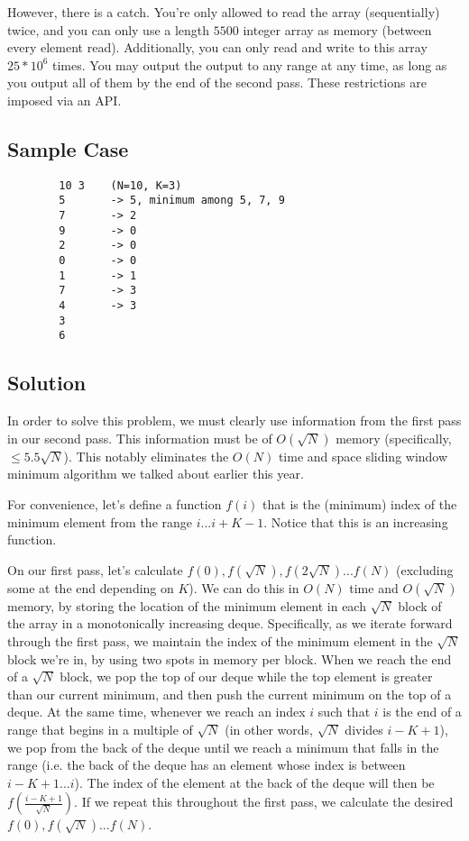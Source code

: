 \documentclass[11pt]{article}
\begin{document}
        However, there is a catch. You're only allowed to read the array (sequentially) twice, and you can only use a length $5500$ integer array as memory (between every element read). Additionally, you can only read and write to this array $25*10^6$ times. You may output the output to any range at any time, as long as you output all of them by the end of the second pass. These restrictions are imposed via an API.
        
    \subsection{Sample Case}
    \begin{verbatim}
        10 3    (N=10, K=3)
        5       -> 5, minimum among 5, 7, 9
        7       -> 2
        9       -> 0
        2       -> 0
        0       -> 0
        1       -> 1
        7       -> 3
        4       -> 3
        3
        6
    \end{verbatim}
    
    \subsection{Solution}
        In order to solve this problem, we must clearly use information from the first pass in our second pass. This information must be of $O(\sqrt N)$ memory (specifically, $\leq 5.5 \sqrt N$). This notably eliminates the $O(N)$ time and space sliding window minimum algorithm we talked about earlier this year.
        
        For convenience, let's define a function $f(i)$ that is the (minimum) index of the minimum element from the range $i...i+K-1$. Notice that this is an increasing function.
        
        On our first pass, let's calculate $f(0), f(\sqrt N), f(2 \sqrt N)... f(N)$ (excluding some at the end depending on $K$). We can do this in $O(N)$ time and $O(\sqrt N)$ memory, by storing the location of the minimum element in each $\sqrt N$ block of the array in a monotonically increasing deque. Specifically, as we iterate forward through the first pass, we maintain the index of the minimum element in the $\sqrt N$ block we're in, by using two spots in memory per block. When we reach the end of a $\sqrt N$ block, we pop the top of our deque while the top element is greater than our current minimum, and then push the current minimum on the top of a deque. At the same time, whenever we reach an index $i$ such that $i$ is the end of a range that begins in a multiple of $\sqrt N$ (in other words, $\sqrt N$ divides $i-K+1$), we pop from the back of the deque until we reach a minimum that falls in the range (i.e. the back of the deque has an element whose index is between $i-K+1...i$). The index of the element at the back of the deque will then be $f(\frac{i-K+1}{\sqrt N})$. If we repeat this throughout the first pass, we calculate the desired $f(0), f(\sqrt N)... f(N)$.
        
\end{document}
